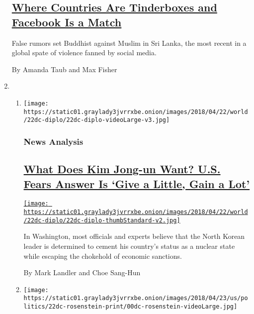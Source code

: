 \begin{enumerate}
  \hypertarget{where-countries-are-tinderboxes-and-facebook-is-a-match}{%
  \subsection{\texorpdfstring{\href{/2018/04/21/world/asia/facebook-sri-lanka-riots.html}{Where
  Countries Are Tinderboxes and Facebook Is a
  Match}}{Where Countries Are Tinderboxes and Facebook Is a Match}}\label{where-countries-are-tinderboxes-and-facebook-is-a-match}}

  False rumors set Buddhist against Muslim in Sri Lanka, the most recent
  in a global spate of violence fanned by social media.

  By Amanda Taub and Max Fisher
\item
  \begin{enumerate}
  \def\labelenumii{\arabic{enumii}.}
  \item
    \texttt{[image: https://static01.graylady3jvrrxbe.onion/images/2018/04/22/world/22dc-diplo/22dc-diplo-videoLarge-v3.jpg]}

    \hypertarget{news-analysis}{%
    \subsubsection{News Analysis}\label{news-analysis}}

    \hypertarget{what-does-kim-jong-un-want-us-fears-answer-is-give-a-little-gain-a-lot}{%
    \subsection{\texorpdfstring{\href{/2018/04/21/us/politics/trump-north-korea.html}{What
    Does Kim Jong-un Want? U.S. Fears Answer Is `Give a Little, Gain a
    Lot'}}{What Does Kim Jong-un Want? U.S. Fears Answer Is `Give a Little, Gain a Lot'}}\label{what-does-kim-jong-un-want-us-fears-answer-is-give-a-little-gain-a-lot}}

    \href{/2018/04/21/us/politics/trump-north-korea.html}{\texttt{[image: https://static01.graylady3jvrrxbe.onion/images/2018/04/22/world/22dc-diplo/22dc-diplo-thumbStandard-v2.jpg]}}

    In Washington, most officials and experts believe that the North
    Korean leader is determined to cement his country's status as a
    nuclear state while escaping the chokehold of economic sanctions.

    By Mark Landler and Choe Sang-Hun
  \item
    \texttt{[image: https://static01.graylady3jvrrxbe.onion/images/2018/04/23/us/politics/22dc-rosenstein-print/00dc-rosenstein-videoLarge.jpg]}


\end{enumerate}
\end{enumerate}

